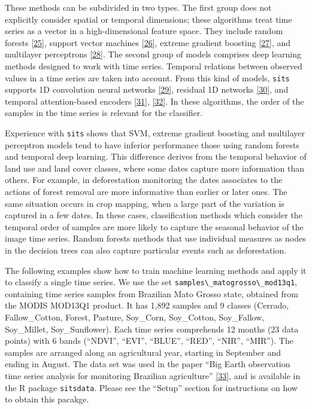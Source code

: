 \documentclass[
  11pt,
]{report}
\newcommand{\passthrough}[1]{#1}
\begin{document}
\newpage

These methods can be subdivided in two types. The first group does not
explicitly consider spatial or temporal dimensions; these algorithms
treat time series as a vector in a high-dimensional feature space. They
include random forests \protect\hyperlink{ref-Belgiu2016}{{[}25{]}},
support vector machines
\protect\hyperlink{ref-Mountrakis2011}{{[}26{]}}, extreme gradient
boosting \protect\hyperlink{ref-Chen2016}{{[}27{]}}, and multilayer
perceptrons \protect\hyperlink{ref-Parente2019a}{{[}28{]}}. The second
group of models comprises deep learning methods designed to work with
time series. Temporal relations between observed values in a time series
are taken into account. From this kind of models,
\passthrough{\lstinline!sits!} supports 1D convolution neural networks
\protect\hyperlink{ref-Pelletier2019}{{[}29{]}}, residual 1D networks
\protect\hyperlink{ref-Fawaz2020}{{[}30{]}}, and temporal
attention-based encoders \protect\hyperlink{ref-Garnot2020a}{{[}31{]}},
\protect\hyperlink{ref-Russwurm2020}{{[}32{]}}. In these algorithms, the
order of the samples in the time series is relevant for the classifier.

Experience with \passthrough{\lstinline!sits!} shows that SVM, extreme
gradient boosting and multilayer perceptron models tend to have inferior
performance those using random forests and temporal deep learning. This
difference derives from the temporal behavior of land use and land cover
classes, where some dates capture more information than others. For
example, in deforestation monitoring the dates associates to the actions
of forest removal are more informative than earlier or later ones. The
same situation occurs in crop mapping, when a large part of the
variation is captured in a few dates. In these cases, classification
methods which consider the temporal order of samples are more likely to
capture the seasonal behavior of the image time series. Random forests
methods that use individual measures as nodes in the decision trees can
also capture particular events such as deforestation.

The following examples show how to train machine learning methods and
apply it to classify a single time series. We use the set
\passthrough{\lstinline!samples\_matogrosso\_mod13q1!}, containing time
series samples from Brazilian Mato Grosso state, obtained from the MODIS
MOD13Q1 product. It has 1,892 samples and 9 classes (Cerrado,
Fallow\_Cotton, Forest, Pasture, Soy\_Corn, Soy\_Cotton, Soy\_Fallow,
Soy\_Millet, Soy\_Sunflower). Each time series comprehends 12 months (23
data points) with 6 bands (``NDVI'', ``EVI'', ``BLUE'', ``RED'',
``NIR'', ``MIR''). The samples are arranged along an agricultural year,
starting in September and ending in August. The data set was used in the
paper ``Big Earth observation time series analysis for monitoring
Brazilian agriculture'' \protect\hyperlink{ref-Picoli2018}{{[}33{]}},
and is available in the R package \passthrough{\lstinline!sitsdata!}.
Please see the ``Setup'' section for instructions on how to obtain this
pacakge.
\end{document}
